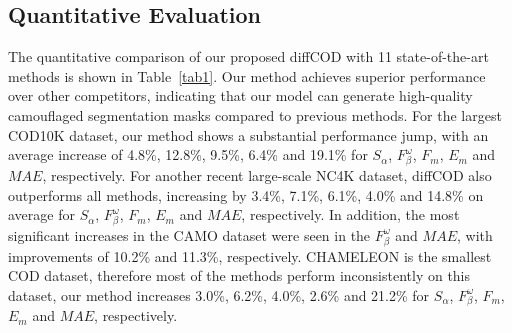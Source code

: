 \documentclass{ecai}
\begin{document}
\subsection{Quantitative Evaluation}
The quantitative comparison of our proposed diffCOD with 11 state-of-the-art methods is shown in Table~\ref{tab1}. Our method achieves superior performance over other competitors, indicating that our model can generate high-quality camouflaged segmentation masks compared to previous methods. 
For the largest COD10K dataset, our method shows a substantial performance jump, with an average increase of 4.8\%, 12.8\%, 9.5\%, 6.4\% and 19.1\% for $S_{\alpha}$, $F_{\beta}^{\omega}$, $F_{m}$, $E_{m}$ and $MAE$, respectively. 
For another recent large-scale NC4K dataset, diffCOD also outperforms all methods, increasing by 3.4\%, 7.1\%, 6.1\%, 4.0\% and 14.8\% on average for $S_{\alpha}$, $F_{\beta}^{\omega}$, $F_{m}$, $E_{m}$ and $MAE$, respectively.
In addition, the most significant increases in the CAMO dataset were seen in the $F_{\beta}^{\omega}$ and $MAE$, with improvements of 10.2\% and 11.3\%, respectively. 
CHAMELEON is the smallest COD dataset, therefore most of the methods perform inconsistently on this dataset, our method increases 3.0\%, 6.2\%, 4.0\%, 2.6\% and 21.2\% for $S_{\alpha}$, $F_{\beta}^{\omega}$, $F_{m}$, $E_{m}$ and $MAE$, respectively.
\end{document}

